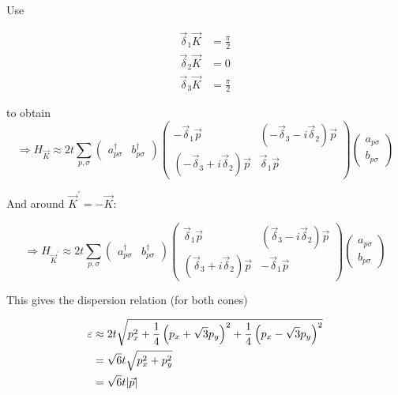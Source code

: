 \documentclass[../../../main.tex]{subfiles}
\begin{document}
Use 

\begin{align}
	\vec{\delta}_1\vec{K} &= \frac{\pi}{2} \\
	\vec{\delta}_2\vec{K} &=0 \\
	\vec{\delta}_3\vec{K} &= \frac{\pi}{2}
\end{align}

to obtain 
\begin{equation}
	\Rightarrow H_{\vec{K}}  \approx 2t \sum_{p, \sigma}
	\begin{pmatrix}
		a_{p\sigma}^\dagger & b_{p\sigma}^\dagger
	\end{pmatrix}
	\begin{pmatrix}
		-\vec{\delta}_1\vec{p} & \left(-\vec{\delta}_3 -i \vec{\delta}_2\right)\vec{p} \\
		\left(-\vec{\delta}_3 +i \vec{\delta}_2\right)\vec{p}  & \vec{\delta}_1\vec{p}
	\end{pmatrix}
	\begin{pmatrix}
		a_{p\sigma} \\
		b_{p\sigma}
	\end{pmatrix}
\end{equation}


And around $\vec{K}^\prime = -\vec{K}$:

\begin{equation}
	\Rightarrow H_{\vec{K}^\prime}  \approx 2t \sum_{p, \sigma}
	\begin{pmatrix}
		a_{p\sigma}^\dagger & b_{p\sigma}^\dagger
	\end{pmatrix}
	\begin{pmatrix}
		\vec{\delta}_1\vec{p} & \left(\vec{\delta}_3 -i \vec{\delta}_2\right)\vec{p} \\
		\left(\vec{\delta}_3 +i \vec{\delta}_2\right)\vec{p}  & -\vec{\delta}_1\vec{p}
	\end{pmatrix}
	\begin{pmatrix}
		a_{p\sigma} \\
		b_{p\sigma}
	\end{pmatrix}
\end{equation}


This gives the dispersion relation (for both cones)

\begin{align}
	\varepsilon &\approx 2t\sqrt{ p_x ^2 + \frac14\left(p_x + \sqrt{3}p_y\right)^2 + \frac14\left(p_x -  \sqrt{3}p_y\right)^2} \notag \\
	&= \sqrt{6}t \sqrt{ p_x^2 + p_y ^2} \notag\\
	&= \sqrt{6}t \abs{\vec{p}}
\end{align}
\end{document}
